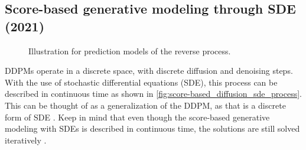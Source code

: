\subsection{Score-based generative modeling through SDE (2021) \cite{song_score-based_2021}} \label{sec:unconditional_sde}

\begin{figure}[b]
\centering
{}
\caption{Illustration for prediction models of the reverse process.}
\label{fig:score-based_diffusion_sde_process}
\end{figure}

DDPMs operate in a discrete space, with discrete diffusion and denoising steps. With the use of stochastic differential equations (SDE), this process can be described in continuous time as shown in \autoref{fig:score-based_diffusion_sde_process}. This can be thought of as a generalization of the DDPM, as that is a discrete form of SDE \cite{song_score-based_2021}. 
Keep in mind that even though the score-based generative modeling with SDEs is described in continuous time, the solutions are still solved iteratively \cite{song_score-based_2021}.

